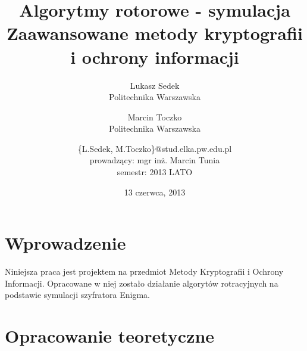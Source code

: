 \documentclass[11pt,a4paper,polish]{article}
\title{Algorytmy rotorowe - symulacja\\
Zaawansowane metody kryptografii i ochrony informacji 
}
\date{13 czerwca, 2013}
\author{Lukasz Sedek\\ Politechnika Warszawska
        \and Marcin Toczko\\ Politechnika Warszawska
        \and \{L.Sedek, M.Toczko\}@stud.elka.pw.edu.pl\\
        prowadzący: mgr inż. Marcin Tunia\\
        semestr: 2013 LATO}
\begin{document}
\maketitle %
\newpage


\section{Wprowadzenie}

Niniejsza praca jest projektem na przedmiot Metody Kryptografii i Ochrony
Informacji. Opracowane w niej zostało działanie algorytów rotracyjnych na
podstawie symulacji szyfratora Enigma.

 

\section{Opracowanie teoretyczne}
\end{document}
